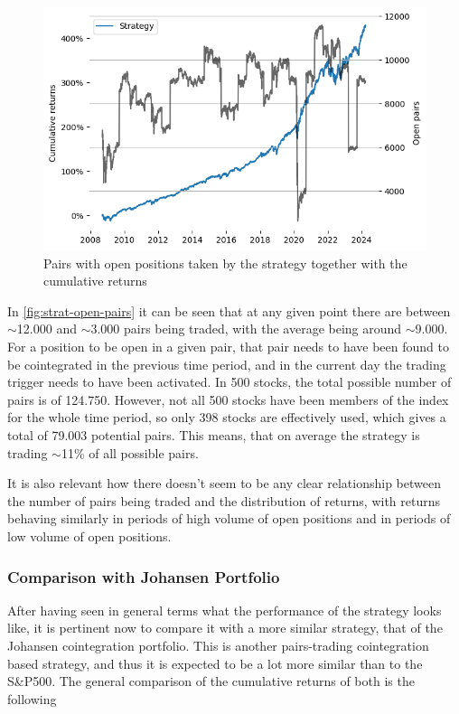 \begin{figure}[ht]
    \captionsetup{justification=centering}
    \includegraphics[width=\linewidth]{assets/strat-open-pairs.png}
    \caption{Pairs with open positions taken by the strategy together with the cumulative returns}
    \label{fig:strat-open-pairs}
\end{figure}

In \autoref{fig:strat-open-pairs} it can be seen that at any given point there are between $\sim$12.000 and $\sim$3.000 pairs being traded, with the average being around $\sim$9.000. For a position to be open in a given pair, that pair needs to have been found to be cointegrated in the previous time period, and in the current day the trading trigger needs to have been activated. In 500 stocks, the total possible number of pairs is of 124.750. However, not all 500 stocks have been members of the index for the whole time period, so only 398 stocks are effectively used, which gives a total of 79.003 potential pairs. This means, that on average the strategy is trading $\sim$11\% of all possible pairs. 

It is also relevant how there doesn't seem to be any clear relationship between the number of pairs being traded and the distribution of returns, with returns behaving similarly in periods of high volume of open positions and in periods of low volume of open positions. 

\subsubsection{Comparison with Johansen Portfolio}
After having seen in general terms what the performance of the strategy looks like, it is pertinent now to compare it with a more similar strategy, that of the Johansen cointegration portfolio. This is another pairs-trading cointegration based strategy, and thus it is expected to be a lot more similar than to the S\&P500. The general comparison of the cumulative returns of both is the following

